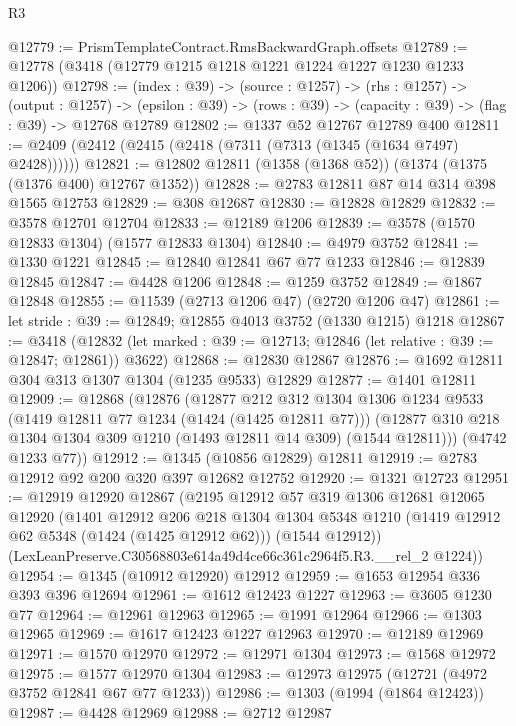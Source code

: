 \begin{lexlean}{R3}
\begin{coremodule}
@12779 := PrismTemplateContract.RmsBackwardGraph.offsets
@12789 := @12778 (@3418 (@12779 @1215 @1218 @1221 @1224 @1227 @1230 @1233 @1206))
@12798 := (index : @39) ->
  (source : @1257) ->
  (rhs : @1257) ->
  (output : @1257) ->
  (epsilon : @39) -> (rows : @39) -> (capacity : @39) -> (flag : @39) -> @12768 @12789
@12802 := @1337 @52 @12767 @12789 @400
@12811 := @2409 (@2412 (@2415 (@2418 (@7311 (@7313 (@1345 (@1634 @7497) @2428))))))
@12821 := @12802 @12811 (@1358 (@1368 @52)) (@1374 (@1375 (@1376 @400) @12767 @1352))
@12828 := @2783 @12811 @87 @14 @314 @398 @1565 @12753
@12829 := @308 @12687
@12830 := @12828 @12829
@12832 := @3578 @12701 @12704
@12833 := @12189 @1206
@12839 := @3578 (@1570 @12833 @1304) (@1577 @12833 @1304)
@12840 := @4979 @3752
@12841 := @1330 @1221
@12845 := @12840 @12841 @67 @77 @1233
@12846 := @12839 @12845
@12847 := @4428 @1206
@12848 := @1259 @3752
@12849 := @1867 @12848
@12855 := @11539 (@2713 @1206 @47) (@2720 @1206 @47)
@12861 := let stride : @39 := @12849; @12855 @4013 @3752 (@1330 @1215) @1218
@12867 := @3418
    (@12832 (let marked : @39 := @12713; @12846 (let relative : @39 := @12847; @12861)) @3622)
@12868 := @12830 @12867
@12876 := @1692 @12811 @304 @313 @1307 @1304 (@1235 @9533) @12829
@12877 := @1401 @12811
@12909 := @12868
    (@12876
      (@12877
        @212
        @312
        @1304
        @1306
        @1234
        @9533
        (@1419 @12811 @77 @1234 (@1424 (@1425 @12811 @77)))
        (@12877 @310 @218 @1304 @1304 @309 @1210 (@1493 @12811 @14 @309) (@1544 @12811)))
      (@4742 @1233 @77))
@12912 := @1345 (@10856 @12829) @12811
@12919 := @2783 @12912 @92 @200 @320 @397 @12682 @12752
@12920 := @1321 @12723
@12951 := @12919
    @12920
    @12867
    (@2195
      @12912
      @57
      @319
      @1306
      @12681
      @12065
      @12920
      (@1401
        @12912
        @206
        @218
        @1304
        @1304
        @5348
        @1210
        (@1419 @12912 @62 @5348 (@1424 (@1425 @12912 @62)))
        (@1544 @12912))
      (LexLeanPreserve.C30568803e614a49d4ce66c361c2964f5.R3.__rel_2 @1224))
@12954 := @1345 (@10912 @12920) @12912
@12959 := @1653 @12954 @336 @393 @396 @12694
@12961 := @1612 @12423 @1227
@12963 := @3605 @1230 @77
@12964 := @12961 @12963
@12965 := @1991 @12964
@12966 := @1303 @12965
@12969 := @1617 @12423 @1227 @12963
@12970 := @12189 @12969
@12971 := @1570 @12970
@12972 := @12971 @1304
@12973 := @1568 @12972
@12975 := @1577 @12970 @1304
@12983 := @12973 @12975 (@12721 (@4972 @3752 @12841 @67 @77 @1233))
@12986 := @1303 (@1994 (@1864 @12423))
@12987 := @4428 @12969
@12988 := @2712 @12987

\end{coremodule}
\end{lexlean}
